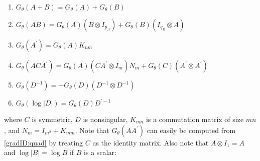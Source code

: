 \documentclass[12pt]{article}
\newcommand{\Gt}{G_\theta}
\begin{document}
	\begin{enumerate}[label=(\alph*)]
	\item \label{gradID:sum} $\Gt(A + B) = \Gt(A) + \Gt(B)$
	\item \label{gradID:mult} $\Gt(A B) = \Gt(A) (B \otimes I_{p_A}) + \Gt(B)(I_{q_B} \otimes A)$
	\item \label{gradID:trans} $\Gt(A^\prime) = \Gt(A) K_{nm}$ 
	\item \label{gradID:quad} $\Gt(ACA^\prime) = \Gt(A)(CA^\prime \otimes I_m) N_m + \Gt(C)(A^\prime \otimes A^\prime)$
	\item \label{gradID:inv} $\Gt(D^{-1}) = -\Gt(D)(D^{-1} \otimes D^{-1})$ 
	\item \label{gradID:logdet} $\Gt(\log |D|) = \Gt(D) D^{\prime-1}$
	\end{enumerate}
	where $C$ is symmetric, $D$ is nonsingular, $K_{mn}$ is a commutation matrix of size $mn$, and $N_m = I_{m^2} + K_{mm}$. Note that $\Gt(AA^\prime)$ can easily be computed from \ref{gradID:quad} by treating $C$ as the identity matrix. Also note that $A \otimes I_1 = A$ and $\log |B| = \log B$ if $B$ is a scalar:



 
\end{document}
